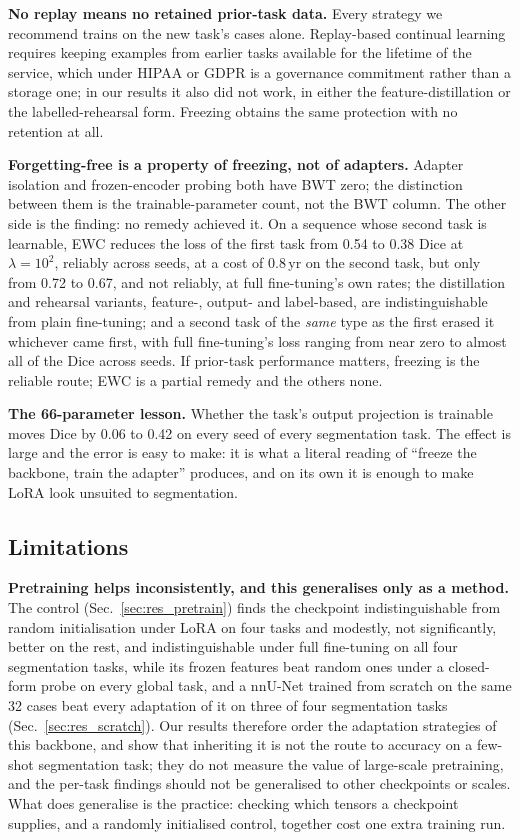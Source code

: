 \iffull\documentclass[journal]{IEEEtran}\else\documentclass[journal,twoside,web]{ieeecolor}\usepackage{generic}\fi
\begin{document}
\textbf{No replay means no retained prior-task data.} Every strategy we recommend trains on the new task's cases alone. Replay-based continual learning requires keeping examples from earlier tasks available for the lifetime of the service, which under HIPAA or GDPR is a governance commitment rather than a storage one; in our results it also did not work, in either the feature-distillation or the labelled-rehearsal form. Freezing obtains the same protection with no retention at all.

\textbf{Forgetting-free is a property of freezing, not of adapters.} Adapter isolation and frozen-encoder probing both have BWT zero; the distinction between them is the trainable-parameter count, not the BWT column. The other side is the finding: no remedy achieved it. On a sequence whose second task is learnable, EWC reduces the loss of the first task from 0.54 to 0.38 Dice at $\lambda=10^2$, reliably across seeds, at a cost of 0.8\,yr on the second task, but only from 0.72 to 0.67, and not reliably, at full fine-tuning's own rates; the distillation and rehearsal variants, feature-, output- and label-based, are indistinguishable from plain fine-tuning; and a second task of the \emph{same} type as the first erased it whichever came first, with full fine-tuning's loss ranging from near zero to almost all of the Dice across seeds. If prior-task performance matters, freezing is the reliable route; EWC is a partial remedy and the others none.

\textbf{The 66-parameter lesson.} Whether the task's output projection is trainable moves Dice by 0.06 to 0.42 on every seed of every segmentation task. The effect is large and the error is easy to make: it is what a literal reading of ``freeze the backbone, train the adapter'' produces, and on its own it is enough to make LoRA look unsuited to segmentation.

\subsection{Limitations}
\label{sec:limitations}

\textbf{Pretraining helps inconsistently, and this generalises only as a method.} The control (Sec.~\ref{sec:res_pretrain}) finds the checkpoint indistinguishable from random initialisation under LoRA on four tasks and modestly, not significantly, better on the rest, and indistinguishable under full fine-tuning on all four segmentation tasks, while its frozen features beat random ones under a closed-form probe on every global task, and a nnU-Net trained from scratch on the same 32 cases beat every adaptation of it on three of four segmentation tasks (Sec.~\ref{sec:res_scratch}). Our results therefore order the adaptation strategies of this backbone, and show that inheriting it is not the route to accuracy on a few-shot segmentation task; they do not measure the value of large-scale pretraining, and the per-task findings should not be generalised to other checkpoints or scales. What does generalise is the practice: checking which tensors a checkpoint supplies, and a randomly initialised control, together cost one extra training run.
\end{document}
